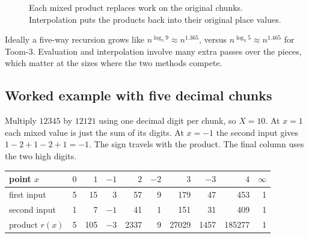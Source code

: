\begin{figure}[H]
\centering
{}
\caption{Each mixed product replaces work on the original chunks. Interpolation
puts the products back into their original place values.}
\end{figure}

Ideally a five-way recursion grows like $n^{\log_5 9}\approx n^{1.365}$,
versus $n^{\log_3 5}\approx n^{1.465}$ for Toom-3. Evaluation and
interpolation involve many extra passes over the pieces, which matter
at the sizes where the two methods compete.

\newpage
\subsection{Worked example with five decimal chunks}

Multiply $12345$ by $12121$ using one decimal digit per chunk, so $X=10$.
At $x=1$ each mixed value is just the sum of its digits. At $x=-1$ the
second input gives $1-2+1-2+1=-1$. The sign travels with the product.
The final column uses the two high digits.

\begin{center}
\small
\begin{tabular}{lrrrrrrrrr}
\toprule
point $x$ & $0$ & $1$ & $-1$ & $2$ & $-2$ & $3$ & $-3$ & $4$ & $\infty$ \\
\midrule
first input & 5 & 15 & 3 & 57 & 9 & 179 & 47 & 453 & 1 \\
second input & 1 & 7 & $-1$ & 41 & 1 & 151 & 31 & 409 & 1 \\
product $r(x)$ & 5 & 105 & $-3$ & 2337 & 9 & 27029 & 1457 & 185277 & 1 \\
\bottomrule
\end{tabular}
\end{center}

